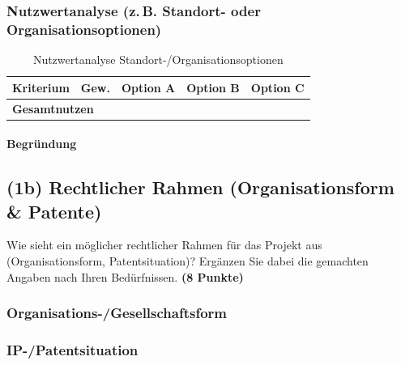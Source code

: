 \documentclass[
%
ngerman %
%
numeric %
]{wbh-assignment}
\begin{document}
\subsubsection{Nutzwertanalyse (z.\,B. Standort- oder Organisationsoptionen)}
\begin{table}[htb!]
\centering
\caption{Nutzwertanalyse Standort-/Organisationsoptionen}
\begin{tabular}{l r r r r}
\textbf{Kriterium} & \textbf{Gew.} & \textbf{Option A} & \textbf{Option B} & \textbf{Option C} \\
\hline
\multicolumn{2}{l}{\textbf{Gesamtnutzen}} & & & \\
\end{tabular}
\end{table}

\paragraph{Begründung}

\clearpage

\subsection{(1b) Rechtlicher Rahmen (Organisationsform \& Patente)}
\begin{aufgabenstellung}
Wie sieht ein möglicher rechtlicher Rahmen für das Projekt aus (Organisationsform, Patentsituation)? Ergänzen Sie dabei die gemachten Angaben nach Ihren Bedürfnissen. \textbf{(8 Punkte)}
\end{aufgabenstellung}

\vspace*{5mm}

\subsubsection{Organisations-/Gesellschaftsform}

\subsubsection{IP-/Patentsituation}
\end{document}
